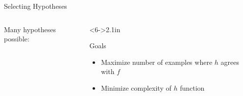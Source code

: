 \documentclass[14pt]{beamer}
\begin{document}
\begin{frame}{Selecting Hypotheses}
\begin{columns}
\begin{column}{2.1in}
Many hypotheses possible:\\
\bigskip
{}%
%
%
%
%
\end{column}
\begin{column}<6->{2.1in}
\begin{block}{Goals}
\begin{itemize}
\item Maximize number of examples where $h$ agrees with $f$
\item Minimize complexity of $h$ function
\end{itemize}
\end{block}
\bigskip
{}
\end{column}
\end{columns}
\end{frame}
\end{document}
